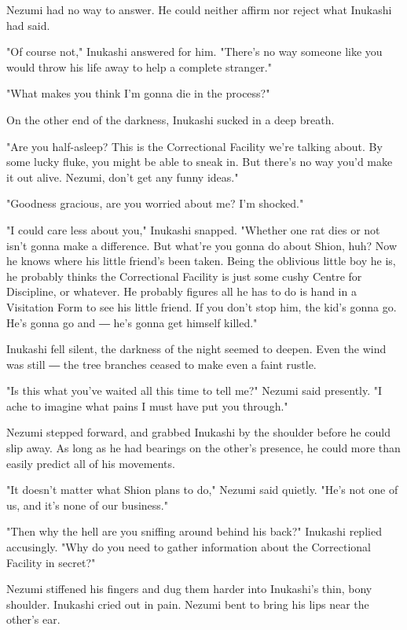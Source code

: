Nezumi had no way to answer. He could neither affirm nor reject what
Inukashi had said.

"Of course not," Inukashi answered for him. "There's no way someone like
you would throw his life away to help a complete stranger."

"What makes you think I'm gonna die in the process?"

On the other end of the darkness, Inukashi sucked in a deep breath.

"Are you half-asleep? This is the Correctional Facility we're talking
about. By some lucky fluke, you might be able to sneak in. But there's
no way you'd make it out alive. Nezumi, don't get any funny ideas."

"Goodness gracious, are you worried about me? I'm shocked."

"I could care less about you," Inukashi snapped. "Whether one rat dies
or not isn't gonna make a difference. But what're you gonna do about
Shion, huh? Now he knows where his little friend's been taken. Being the
oblivious little boy he is, he probably thinks the Correctional Facility
is just some cushy Centre for Discipline, or whatever. He probably
figures all he has to do is hand in a Visitation Form to see his little
friend. If you don't stop him, the kid's gonna go. He's gonna go and ―
he's gonna get himself killed."

Inukashi fell silent, the darkness of the night seemed to deepen. Even
the wind was still ― the tree branches ceased to make even a faint
rustle.

"Is this what you've waited all this time to tell me?" Nezumi said
presently. "I ache to imagine what pains I must have put you through."

Nezumi stepped forward, and grabbed Inukashi by the shoulder before he
could slip away. As long as he had bearings on the other's presence, he
could more than easily predict all of his movements.

"It doesn't matter what Shion plans to do," Nezumi said quietly. "He's
not one of us, and it's none of our business."

"Then why the hell are you sniffing around behind his back?" Inukashi
replied accusingly. "Why do you need to gather information about the
Correctional Facility in secret?"

Nezumi stiffened his fingers and dug them harder into Inukashi's thin,
bony shoulder. Inukashi cried out in pain. Nezumi bent to bring his lips
near the other's ear.

